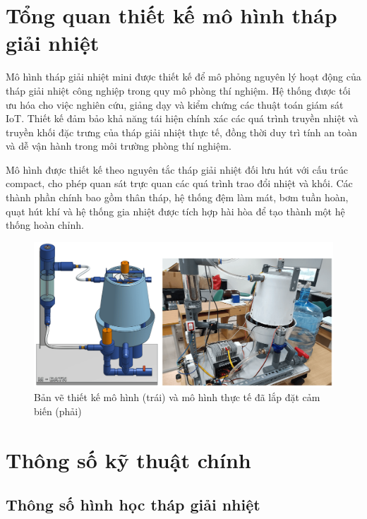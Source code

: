 \documentclass[../main.tex]{subfiles}
\begin{document}
\section{Tổng quan thiết kế mô hình tháp giải nhiệt}
\label{sec:design_overview}

Mô hình tháp giải nhiệt mini được thiết kế để mô phỏng nguyên lý hoạt động của tháp giải nhiệt công nghiệp trong quy mô phòng thí nghiệm. Hệ thống được tối ưu hóa cho việc nghiên cứu, giảng dạy và kiểm chứng các thuật toán giám sát IoT. Thiết kế đảm bảo khả năng tái hiện chính xác các quá trình truyền nhiệt và truyền khối đặc trưng của tháp giải nhiệt thực tế, đồng thời duy trì tính an toàn và dễ vận hành trong môi trường phòng thí nghiệm.

Mô hình được thiết kế theo nguyên tắc tháp giải nhiệt đối lưu hút với cấu trúc compact, cho phép quan sát trực quan các quá trình trao đổi nhiệt và khối. Các thành phần chính bao gồm thân tháp, hệ thống đệm làm mát, bơm tuần hoàn, quạt hút khí và hệ thống gia nhiệt được tích hợp hài hòa để tạo thành một hệ thống hoàn chỉnh.

\begin{figure}[H]
    \centering
    \includegraphics[width=1\textwidth]{Hinhve/thiet_ke_vs_thuc_te.png}
    \caption{Bản vẽ thiết kế mô hình (trái) và mô hình thực tế đã lắp đặt cảm biến (phải)}
    \label{fig:thiet_ke_vs_thuc_te}
\end{figure}

\section{Thông số kỹ thuật chính}
\label{sec:main_specifications}

\subsection{Thông số hình học tháp giải nhiệt}
\label{sec:geometric_parameters}
\end{document}
